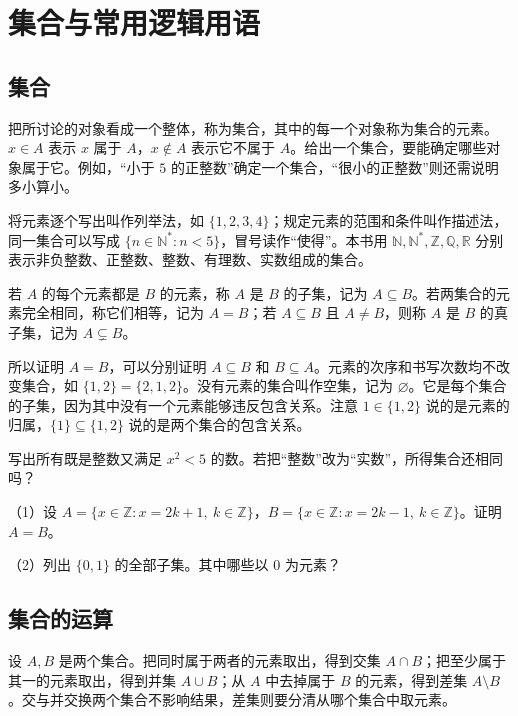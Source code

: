 \chapter{集合与常用逻辑用语}\label{app:sets-logic}
\begingroup
\fontsize{12pt}{20pt}\selectfont
\setlength{\parskip}{4pt}

\section{集合}
把所讨论的对象看成一个整体，称为{\heiti{}集合}，其中的每一个对象称为集合的{\heiti{}元素}。\(x\in A\) 表示 \(x\) 属于 \(A\)，\(x\notin A\) 表示它不属于 \(A\)。给出一个集合，要能确定哪些对象属于它。例如，“小于 \(5\) 的正整数”确定一个集合，“很小的正整数”则还需说明多小算小。

将元素逐个写出叫作{\heiti{}列举法}，如 \(\{1,2,3,4\}\)；规定元素的范围和条件叫作{\heiti{}描述法}，同一集合可以写成 \(\{n\in\mathbb N^*:n<5\}\)，冒号读作“使得”。本书用 \(\mathbb N,\mathbb N^*,\mathbb Z,\mathbb Q,\mathbb R\) 分别表示非负整数、正整数、整数、有理数、实数组成的集合。

\begin{definition}
若 \(A\) 的每个元素都是 \(B\) 的元素，称 \(A\) 是 \(B\) 的{\heiti{}子集}，记为 \(A\subseteq B\)。若两集合的元素完全相同，称它们相等，记为 \(A=B\)；若 \(A\subseteq B\) 且 \(A\ne B\)，则称 \(A\) 是 \(B\) 的{\heiti{}真子集}，记为 \(A\subsetneq B\)。
\end{definition}
所以证明 \(A=B\)，可以分别证明 \(A\subseteq B\) 和 \(B\subseteq A\)。元素的次序和书写次数均不改变集合，如 \(\{1,2\}=\{2,1,2\}\)。没有元素的集合叫作{\heiti{}空集}，记为 \(\varnothing\)。它是每个集合的子集，因为其中没有一个元素能够违反包含关系。注意 \(1\in\{1,2\}\) 说的是元素的归属，\(\{1\}\subseteq\{1,2\}\) 说的是两个集合的包含关系。

\begin{example}
写出所有既是整数又满足 \(x^2<5\) 的数。若把“整数”改为“实数”，所得集合还相同吗？
\end{example}

\begin{exercise}
\mbox{}\par\nobreak

（1）设 \(A=\{x\in\mathbb Z:x=2k+1,\ k\in\mathbb Z\}\)，\(B=\{x\in\mathbb Z:x=2k-1,\ k\in\mathbb Z\}\)。证明 \(A=B\)。

（2）列出 \(\{0,1\}\) 的全部子集。其中哪些以 \(0\) 为元素？
\end{exercise}

\section{集合的运算}
设 \(A,B\) 是两个集合。把同时属于两者的元素取出，得到{\heiti{}交集} \(A\cap B\)；把至少属于其一的元素取出，得到{\heiti{}并集} \(A\cup B\)；从 \(A\) 中去掉属于 \(B\) 的元素，得到{\heiti{}差集} \(A\setminus B\)。交与并交换两个集合不影响结果，差集则要分清从哪个集合中取元素。

